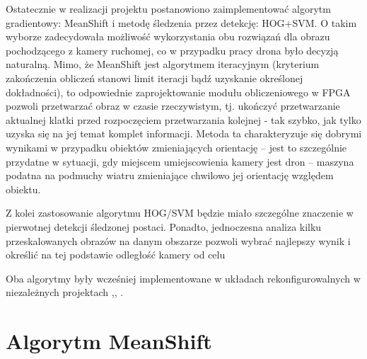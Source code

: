 Ostatecznie w realizacji projektu postanowiono zaimplementować algorytm gradientowy: MeanShift i metodę śledzenia przez detekcję: HOG+SVM. %
O takim wyborze zadecydowała możliwość wykorzystania obu rozwiązań dla obrazu pochodzącego z kamery ruchomej, co w przypadku pracy drona było decyzją naturalną. %
Mimo, że MeanShift jest algorytmem iteracyjnym (kryterium zakończenia obliczeń stanowi limit iteracji bądź uzyskanie określonej dokładności), to odpowiednie zaprojektowanie modułu obliczeniowego w FPGA pozwoli przetwarzać obraz w czasie rzeczywistym, tj. ukończyć przetwarzanie aktualnej klatki przed rozpoczęciem przetwarzania kolejnej - tak szybko, jak tylko uzyska się na jej temat komplet informacji. %
Metoda ta charakteryzuje się dobrymi wynikami w przypadku obiektów zmieniających orientację -- jest to szczególnie przydatne w sytuacji, gdy miejscem umiejscowienia kamery jest dron -- maszyna podatna na podmuchy wiatru zmieniające chwilowo jej orientację względem obiektu. 

Z kolei zastosowanie algorytmu HOG/SVM będzie miało szczególne znaczenie w pierwotnej detekcji śledzonej postaci. Ponadto, jednoczesna analiza kilku przeskalowanych obrazów na danym obszarze pozwoli wybrać najlepszy wynik i określić na tej podstawie odległość kamery od celu  %

Oba algorytmy były wcześniej implementowane w układach rekonfigurowalnych w niezależnych projektach \cite{Mazur},\cite{Patel}, \cite{Drozdz}.

\section{Algorytm MeanShift}

